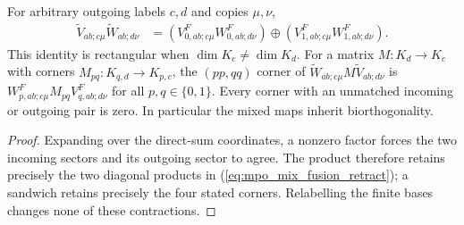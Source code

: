 \begin{lemma}
    \label{thm:mpo_mixed_fusion_maps}
    \leanok
    For arbitrary outgoing labels $c,d$ and copies $\mu,\nu$,
    \begin{align}
        \widetilde V_{ab;c\mu}\widetilde W_{ab;d\nu}
         & =(V^F_{0,ab;c\mu}W^F_{0,ab;d\nu})
        \oplus(V^F_{1,ab;c\mu}W^F_{1,ab;d\nu}).
        \label{eq:mpo_mix_fusion_retract}
    \end{align}
    This identity is rectangular when $\dim K_c\ne\dim K_d$.
    For a matrix $M:K_d\to K_c$ with corners $M_{pq}:K_{q,d}\to K_{p,c}$,
    the $(pp,qq)$ corner of
    $\widetilde W_{ab;c\mu}M\widetilde V_{ab;d\nu}$ is
    $W^F_{p,ab;c\mu}M_{pq}V^F_{q,ab;d\nu}$ for all $p,q\in\{0,1\}$.
    Every corner with an unmatched incoming or outgoing pair is zero.
    In particular the mixed maps inherit biorthogonality.
\end{lemma}
\begin{proof}
    \leanok
    Expanding over the direct-sum coordinates, a nonzero factor forces
    the two incoming sectors and its outgoing sector to agree.
    The product therefore retains precisely the two diagonal products
    in (\ref{eq:mpo_mix_fusion_retract}); a sandwich retains precisely
    the four stated corners. Relabelling the finite bases changes none
    of these contractions.
\end{proof}

